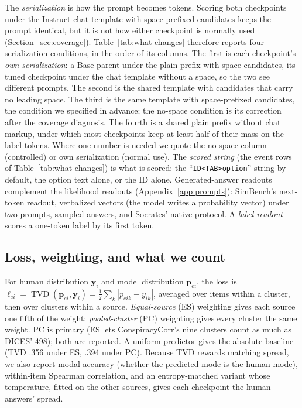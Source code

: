 \documentclass[11pt]{article}
\newcommand{\TVD}{\operatorname{TVD}}
\newcommand{\ES}{\textsc{ES}}
\newcommand{\PC}{\textsc{PC}}
\begin{document}
The \emph{serialization} is how the prompt becomes tokens. Scoring both checkpoints under the Instruct chat template with space-prefixed candidates keeps the prompt identical, but it is not how either checkpoint is normally used (Section~\ref{sec:coverage}). Table~\ref{tab:what-changes} therefore reports four serialization conditions, in the order of its columns. The first is each checkpoint's \emph{own serialization}: a Base parent under the plain prefix with space candidates, its tuned checkpoint under the chat template without a space, so the two see different prompts. The second is the shared template with candidates that carry no leading space. The third is the same template with space-prefixed candidates, the condition we specified in advance; the no-space condition is its correction after the coverage diagnosis. The fourth is a shared plain prefix without chat markup, under which most checkpoints keep at least half of their mass on the label tokens. Where one number is needed we quote the no-space column (controlled) or own serialization (normal use). The \emph{scored string} (the event rows of Table~\ref{tab:what-changes}) is what is scored: the ``\texttt{ID<TAB>option}'' string by default, the option text alone, or the ID alone. Generated-answer readouts complement the likelihood readouts (Appendix~\ref{app:prompts}): SimBench's next-token readout, verbalized vectors (the model writes a probability vector) under two prompts, sampled answers, and Socrates' native protocol. A \emph{label readout} scores a one-token label by its first token.

\subsection{Loss, weighting, and what we count}
\label{sec:weights}

For human distribution $\mathbf y_i$ and model distribution $\mathbf p_{ei}$,
the loss is $\ell_{ei}=\TVD(\mathbf p_{ei},\mathbf y_i)=
\tfrac12\sum_k|p_{eik}-y_{ik}|$, averaged over items within a cluster, then
over clusters within a source. \emph{Equal-source} (\ES{}) weighting gives
each source one fifth of the weight; \emph{pooled-cluster} (\PC{}) weighting
gives every cluster the same weight. \PC{} is primary (\ES{} lets ConspiracyCorr's nine clusters count as much as DICES' 498); both are reported. A uniform predictor gives the absolute baseline (TVD .356 under \ES{}, .394 under \PC{}). Because TVD rewards matching spread, we also report modal accuracy (whether the predicted mode is the human mode),
within-item Spearman correlation, and an entropy-matched variant whose
temperature, fitted on the other sources, gives each checkpoint the human
answers' spread.
\end{document}

